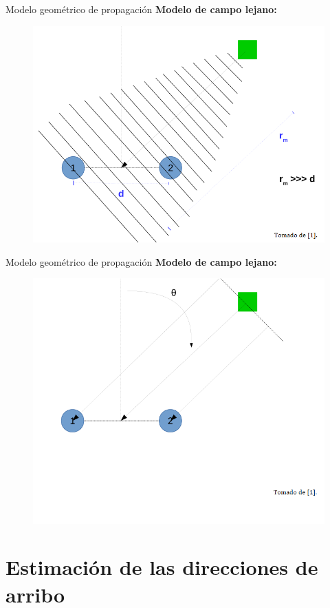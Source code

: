\documentclass[12pt,aspectratio=169]{beamer}
\begin{document}
	\begin{frame}{Modelo geométrico de propagación}
		\textbf{Modelo de campo lejano:}
		\begin{figure}[h]
			\centering
			\includegraphics[width=0.55\linewidth]{figures/array2.png}	
		\end{figure}		
	\end{frame}
	
	\begin{frame}{Modelo geométrico de propagación}
		\textbf{Modelo de campo lejano:}
		\begin{figure}[h]
			\centering
			\includegraphics[width=0.55\linewidth]{figures/array3.png}
		\end{figure}
	\end{frame}
	
	\section{Estimación de las direcciones de arribo}
	
\end{document}
